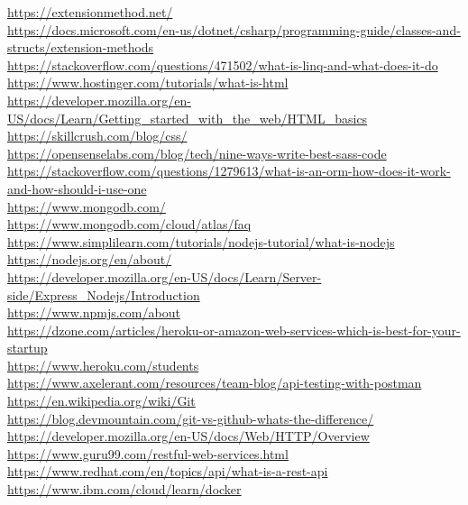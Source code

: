 \url{https://extensionmethod.net/}\\
\url{https://docs.microsoft.com/en-us/dotnet/csharp/programming-guide/classes-and-structs/extension-methods}\\
\url{https://stackoverflow.com/questions/471502/what-is-linq-and-what-does-it-do}\\
\url{https://www.hostinger.com/tutorials/what-is-html}\\
\url{https://developer.mozilla.org/en-US/docs/Learn/Getting\_started\_with\_the\_web/HTML\_basics}\\
\url{https://skillcrush.com/blog/css/}\\
\url{https://opensenselabs.com/blog/tech/nine-ways-write-best-sass-code}\\
\url{https://stackoverflow.com/questions/1279613/what-is-an-orm-how-does-it-work-and-how-should-i-use-one}\\
\url{https://www.mongodb.com/}\\
\url{https://www.mongodb.com/cloud/atlas/faq}\\
\url{https://www.simplilearn.com/tutorials/nodejs-tutorial/what-is-nodejs}\\
\url{https://nodejs.org/en/about/}\\
\url{https://developer.mozilla.org/en-US/docs/Learn/Server-side/Express\_Nodejs/Introduction}\\
\url{https://www.npmjs.com/about}\\
\url{https://dzone.com/articles/heroku-or-amazon-web-services-which-is-best-for-your-startup}\\
\url{https://www.heroku.com/students}\\
\url{https://www.axelerant.com/resources/team-blog/api-testing-with-postman}\\
\url{https://en.wikipedia.org/wiki/Git}\\
\url{https://blog.devmountain.com/git-vs-github-whats-the-difference/}\\
\url{https://developer.mozilla.org/en-US/docs/Web/HTTP/Overview}\\
\url{https://www.guru99.com/restful-web-services.html}\\
\url{https://www.redhat.com/en/topics/api/what-is-a-rest-api}\\
\url{https://www.ibm.com/cloud/learn/docker}\\


